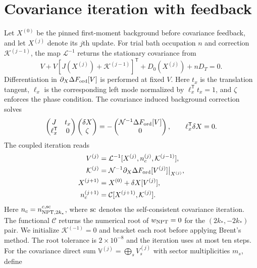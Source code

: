 \documentclass[aps,prl,twocolumn,superscriptaddress,nofootinbib,floatfix]{revtex4-2}
\newcommand{\cN}{\mathcal N}
\begin{document}
\section{Covariance iteration with feedback}
Let $X^{(0)}$ be the pinned first-moment background before covariance feedback, and let $X^{(j)}$ denote its $j$th update. For trial bath occupation $n$ and correction $\mathcal K^{(j-1)}$, the map $\mathcal L^{-1}$ returns the stationary covariance from
\begin{equation}
 [J(X^{(j)})+\mathcal K^{(j-1)}]V+V[J(X^{(j)})+\mathcal K^{(j-1)}]^{\mathsf T}
 +D_0(X^{(j)})+nD_T=0.
 \label{eq:LyapIterationS}
\end{equation}
Differentiation in $\partial_X\Delta F_{\rm ord}[V]$ is performed at fixed $V$. Here $t_x$ is the translation tangent, $\ell_x$ is the corresponding left mode normalized by $\ell_x^{\mathsf T}t_x=1$, and $\zeta$ enforces the phase condition. The covariance induced background correction solves
\begin{equation}
 \begin{pmatrix}J&t_x\\ \ell_x^{\mathsf T}&0\end{pmatrix}
 \begin{pmatrix}\delta X\\ \zeta\end{pmatrix}
 =-\begin{pmatrix}\cN^{-1}\Delta F_{\rm ord}[V]\\0\end{pmatrix},
 \qquad \ell_x^{\mathsf T}\delta X=0.
 \label{eq:backgroundResponseS}
\end{equation}
The coupled iteration reads
\begin{align}
\begin{aligned}
 V^{(j)}&=\mathcal L^{-1}[X^{(j)},n_c^{(j)},\mathcal K^{(j-1)}],\\
 \mathcal K^{(j)}&=\cN^{-1}\partial_X\Delta F_{\rm ord}[V^{(j)}]\big|_{X^{(j)}},\\
 X^{(j+1)}&=X^{(0)}+\delta X[V^{(j)}],\\
 n_c^{(j+1)}&=\mathcal C[X^{(j+1)},\mathcal K^{(j)}].
 \label{eq:iterationS}
 \end{aligned}
\end{align}
Here $n_c=n_{{\rm NPT},2k_*}^{c,{\rm sc}}$, where ${\rm sc}$ denotes the self-consistent covariance iteration. The functional $\mathcal C$ returns the numerical root of $w_{\rm NPT}=0$ for the $(2k_*,-2k_*)$ pair. We initialize $\mathcal K^{(-1)}=0$ and bracket each root before applying Brent's method. The root tolerance is $2\times10^{-8}$ and the iteration uses at most ten steps. For the covariance direct sum $\mathbb V^{(j)}=\bigoplus_s V_s^{(j)}$ with sector multiplicities $m_s$, define
\end{document}
